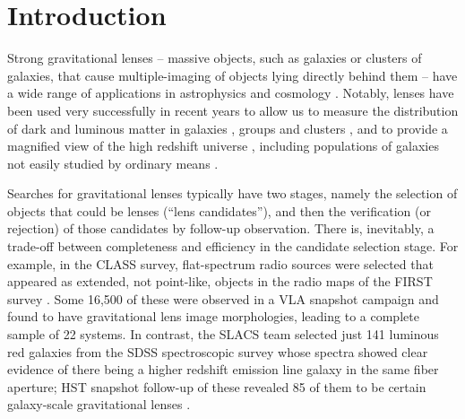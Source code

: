 \documentclass[iop]{emulateapj}
\def\eg{{\it e.g.}\,}
\begin{document}



\section{Introduction}
\label{sec:intro}

Strong gravitational lenses -- massive objects, such as galaxies or  clusters of
galaxies, that  cause multiple-imaging of objects lying directly behind them --
have a wide range of applications in astrophysics and cosmology \citep[see \eg
][for an introduction]{SKW06}. Notably, lenses have been used very successfully
in recent years to allow us to measure the distribution of dark and luminous
matter in galaxies  \citep[\eg][]{Gav++07,Koo++09}, groups
\citep[\eg][]{Lim++09}  and clusters \citep[\eg][]{Bra++06,Lim++08}, and to 
provide a magnified view of the high redshift universe
\citep[\eg][]{Pet++02,Sta++08,Swi++09}, including populations of galaxies not
easily studied by ordinary means  \citep[\eg][]{Bla++99,Sta++07,Bra++09}. 

Searches for gravitational lenses typically have two stages, namely the
selection of objects that could be lenses (``lens candidates''), and then the
verification (or rejection) of those candidates by follow-up observation.  There
is, inevitably, a trade-off between completeness and efficiency in the
candidate  selection stage. For example, in the CLASS survey, flat-spectrum 
radio sources were selected that appeared as extended, not point-like, objects
in the radio maps of the FIRST survey \citep{Bro++03}. Some 16,500 of these were
observed in a  VLA snapshot campaign and found to have gravitational lens image
morphologies, leading to a complete sample of 22 systems. In contrast, the SLACS
team selected just 141 luminous red galaxies from the SDSS spectroscopic survey
whose spectra showed clear evidence of there being a higher redshift emission
line galaxy in the same fiber aperture; HST snapshot  follow-up of these
revealed 85 of them to be certain galaxy-scale gravitational lenses
\citep{Bol++06,Aug++09}. 
\end{document}

